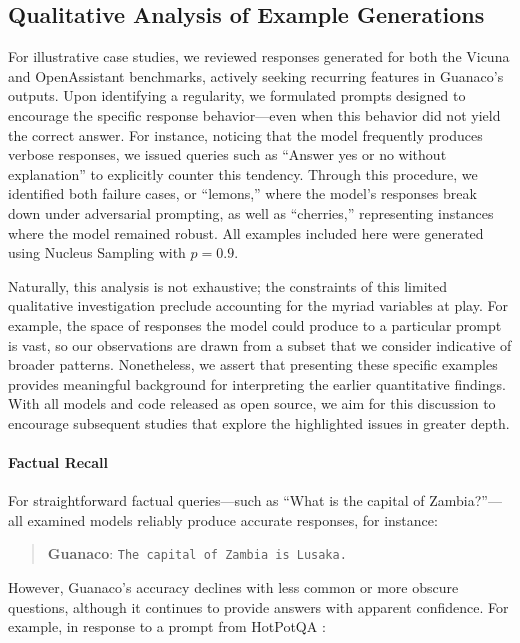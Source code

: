\subsection{Qualitative Analysis of Example Generations}
\label{ssec:examples}

For illustrative case studies, we reviewed responses generated for both the Vicuna and OpenAssistant benchmarks, actively seeking recurring features in {Guanaco}'s outputs. Upon identifying a regularity, we formulated prompts designed to encourage the specific response behavior—even when this behavior did not yield the correct answer. For instance, noticing that the model frequently produces verbose responses, we issued queries such as ``Answer yes or no without explanation'' to explicitly counter this tendency. Through this procedure, we identified both failure cases, or ``lemons,'' where the model's responses break down under adversarial prompting, as well as ``cherries,'' representing instances where the model remained robust. All examples included here were generated using Nucleus Sampling \cite{holtzmancurious} with $p=0.9$.

Naturally, this analysis is not exhaustive; the constraints of this limited qualitative investigation preclude accounting for the myriad variables at play. For example, the space of responses the model could produce to a particular prompt is vast, so our observations are drawn from a subset that we consider indicative of broader patterns. Nonetheless, we assert that presenting these specific examples provides meaningful background for interpreting the earlier quantitative findings. With all models and code released as open source, we aim for this discussion to encourage subsequent studies that explore the highlighted issues in greater depth.

\paragraph{Factual Recall} For straightforward factual queries—such as “What is the capital of Zambia?”—all examined models reliably produce accurate responses, for instance:

\begin{quote} 
    \textbf{Guanaco}:
    \texttt{The capital of Zambia is Lusaka.}
\end{quote}

However, {Guanaco}’s accuracy declines with less common or more obscure questions, although it continues to provide answers with apparent confidence. For example, in response to a prompt from HotPotQA \citep{yang2018hotpotqa}:

